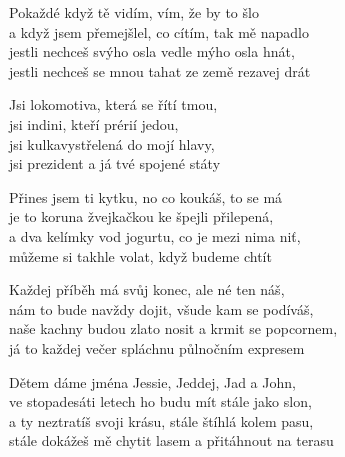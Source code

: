 
\ve{}
Pokaždé když tě vidím, vím, že by to šlo\\
a když jsem přemejšlel, co cítím, tak mě napadlo\\ 
jestli nechceš svýho osla vedle mýho osla hnát,\\ 
jestli nechceš se mnou tahat ze země rezavej drát 

\cho{}
Jsi lokomotiva, která se řítí tmou,\\
jsi indini, kteří prérií jedou,\\
jsi kulkavystřelená do mojí hlavy,\\ 
jsi prezident a já tvé spojené státy

\ve{}
Přines jsem ti kytku, no co koukáš, to se má\\ 
je to koruna žvejkačkou ke špejli přilepená,\\
a dva kelímky vod jogurtu, co je mezi nima niť,\\ 
můžeme si takhle volat, když budeme chtít 

\cho{}

\ve{}
Každej příběh má svůj konec, ale né ten náš,\\ 
nám to bude navždy dojit, všude kam se podíváš,\\ 
naše kachny budou zlato nosit a krmit se popcornem,\\ 
já to každej večer spláchnu půlnočním expresem 

\cho{}
 
\ve{} 
Dětem dáme jména Jessie, Jeddej, Jad a John,\\ 
ve stopadesáti letech ho budu mít stále jako slon,\\ 
a ty neztratíš svoji krásu, stále štíhlá kolem pasu,\\ 
stále dokážeš mě chytit lasem a přitáhnout na terasu 



\esong{}